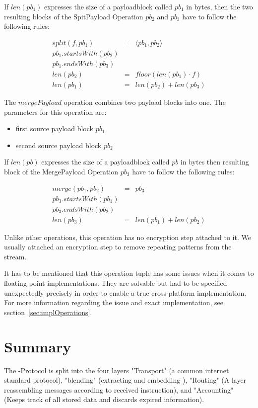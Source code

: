 If $len(pb_1)$ expresses the size of a payloadblock called $pb_1$ in bytes, then the two resulting blocks of the SpitPayload Operation $pb_2$ and $pb_3$ have to follow the following rules:

\begin{eqnarray}
split(f, pb_1) & = &\langle pb_1, pb_2 \rangle\\
pb_1.startsWith(pb_2)\\
pb_1.endsWith(pb_3)\\
len(pb_2) & = & floor(len(pb_1)\cdot f)\\
len(pb_1) & = & len(pb_2) + len(pb_3)
\end{eqnarray}

The $mergePayload$ operation combines two payload blocks into one. The parameters for this operation are:

\begin{itemize}
	\item first source payload block $pb_1$
	\item second source payload block $pb_2$
\end{itemize}

If $len(pb)$ expresses the size of a payloadblock called $pb$ in bytes then resulting block of the MergePayload Operation $pb_3$ have to follow the following rules:

\begin{eqnarray}
merge(pb_1, pb_2) & = & pb_3 \\
pb_3.startsWith(pb_1)\\
pb_3.endsWith(pb_2)\\
len(pb_3) & = & len(pb_1) + len(pb_2)
\end{eqnarray}

Unlike other operations, this operation has no encryption step attached to it. We usually attached an encryption step to remove repeating patterns from the \VortexMessage stream.

It has to be mentioned that this operation tuple has some issues when it comes to floating-point implementations. They are solvable but had to be specified unexpectedly precisely in order to enable a true cross-platform implementation. For more information regarding the issue and exact implementation, see section~\ref{sec:implOperations}.


\section{Summary}
The \MessageVortex{}-Protocol is split into the four layers "Transport" (a common internet standard protocol), "blending" (extracting and embedding \VortexMessages), "Routing" (A layer reassembling messages according to received instruction), and "Accounting" (Keeps track of all stored data and discards expired information).

